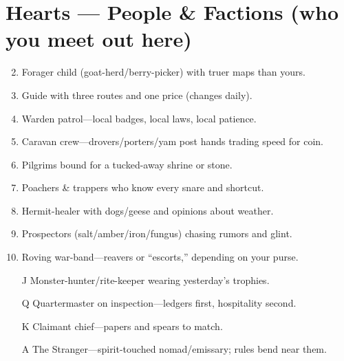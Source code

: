 \section*{Hearts --- People \& Factions (who you meet out here)}
\begin{enumerate}
\setcounter{enumi}{1}
\item Forager child (goat-herd/berry-picker) with truer maps than yours.
\item Guide with three routes and one price (changes daily).
\item Warden patrol---local badges, local laws, local patience.
\item Caravan crew---drovers/porters/yam post hands trading speed for coin.
\item Pilgrims bound for a tucked-away shrine or stone.
\item Poachers \& trappers who know every snare and shortcut.
\item Hermit-healer with dogs/geese and opinions about weather.
\item Prospectors (salt/amber/iron/fungus) chasing rumors and glint.
\item Roving war-band---reavers or ``escorts,'' depending on your purse.
\item[J] Monster-hunter/rite-keeper wearing yesterday's trophies.
\item[Q] Quartermaster on inspection---ledgers first, hospitality second.
\item[K] Claimant chief---papers and spears to match.
\item[A] The Stranger---spirit-touched nomad/emissary; rules bend near them.
\end{enumerate}

